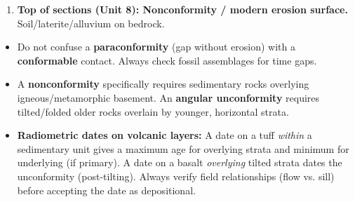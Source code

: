 \documentclass[11pt]{article}
\begin{document}
\begin{exoresolu}
\begin{enumerate}
    \item \textbf{Top of sections (Unit 8): Nonconformity / modern erosion surface.} Soil/laterite/alluvium on bedrock.
\end{enumerate}

\begin{attention}
\begin{itemize}
\item Do not confuse a \textbf{paraconformity} (gap without erosion) with a \textbf{conformable} contact. Always check fossil assemblages for time gaps.
\item A \textbf{nonconformity} specifically requires sedimentary rocks overlying igneous/metamorphic basement. An \textbf{angular unconformity} requires tilted/folded older rocks overlain by younger, horizontal strata.
\item \textbf{Radiometric dates on volcanic layers:} A date on a tuff \emph{within} a sedimentary unit gives a maximum age for overlying strata and minimum for underlying (if primary). A date on a basalt \emph{overlying} tilted strata dates the unconformity (post-tilting). Always verify field relationships (flow vs. sill) before accepting the date as depositional.
\end{itemize}
\end{attention}
\end{exoresolu}
\end{document}
